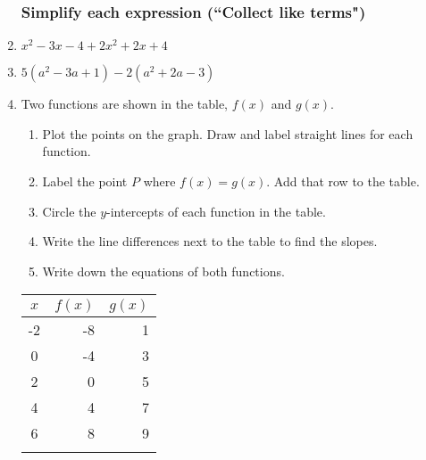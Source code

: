 \documentclass[12pt, oneside]{article}
\begin{document}
\begin{enumerate}
\subsubsection*{Simplify each expression (``Collect like terms")}
  \item $x^2-3x -4 +2x^2+2x+4$ \vspace{1.5cm}
  \item $5(a^2-3a +1) -2(a^2+2a-3)$ \vspace{3cm}

\newpage


\item Two functions are shown in the table, $f(x)$ and $g(x)$.
\begin{enumerate}
  \item Plot the points on the graph. Draw and label straight lines for each function.
  \item Label the point $P$ where $f(x)=g(x)$. Add that row to the table.
  \item Circle the $y$-intercepts of each function in the table.
  \item Write the line differences next to the table to find the slopes.
  \item Write down the equations of both functions.
\end{enumerate}

  \begin{center}
    \begin{tabular}{|c|r|r|}
    \hline
    $x$ & $f(x)$ & $g(x)$\\
    \hline
    -2 & -8 & 1\\
    \hline
    0 & -4 & 3\\
    \hline
    2 & 0 & 5 \\
    \hline
    4 & 4 & 7\\
    \hline
    6 & 8 & 9\\
    \hline
    &  & \\
    \hline
    \end{tabular}
  \end{center}

  \begin{center} %
  \end{center}


\end{enumerate}
\end{document}
